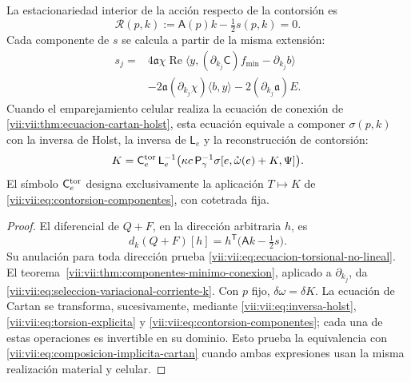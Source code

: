 \begin{proposition}
\label{vii:vii:prop:ecuacion-torsional-no-lineal}
La estacionariedad interior de la acción respecto de la contorsión es
\begin{equation}
 \mathcal R(p,k):=\mathsf A(p)k-\tfrac12s(p,k)=0.
 \label{vii:vii:eq:ecuacion-torsional-no-lineal}
\end{equation}
Cada componente de \(s\) se calcula a partir de la misma extensión:
\begin{equation}
 \begin{split}
 s_j={}&4\mathfrak a\chi\operatorname{Re}
       \langle y,(\partial_{k_j}\mathsf C)f_{\min}
                         -\partial_{k_j}b\rangle\\
 &-2\mathfrak a(\partial_{k_j}\chi)\langle b,y\rangle
       -2(\partial_{k_j}\mathfrak a)E.
 \end{split}
 \label{vii:vii:eq:seleccion-variacional-corriente-k}
\end{equation}
Cuando el emparejamiento celular realiza la ecuación de conexión de
\ref{vii:vii:thm:ecuacion-cartan-holst}, esta ecuación equivale a componer
\(\sigma(p,k)\) con la inversa de Holst, la inversa de
\(\mathsf L_e\) y la reconstrucción de contorsión:
\begin{equation}
 K=\mathsf C_e^{\rm tor}\,\mathsf L_e^{-1}
           \bigl(\kappa c\,\mathsf P_\gamma^{-1}
             \sigma[e,\mathring\omega(e)+K,\Psi]\bigr).
 \label{vii:vii:eq:composicion-implicita-cartan}
\end{equation}
El símbolo \(\mathsf C_e^{\rm tor}\) designa exclusivamente la
aplicación \(T\mapsto K\) de
\eqref{vii:vii:eq:contorsion-componentes}, con cotetrada fija.
\end{proposition}

\begin{proof}
El diferencial de \(Q+F\), en la dirección arbitraria \(h\), es
\[
 d_k(Q+F)[h]
   =h^{\mathsf T}\bigl(\mathsf A k-\tfrac12s\bigr).
\]
Su anulación para toda dirección prueba
\eqref{vii:vii:eq:ecuacion-torsional-no-lineal}.
El teorema~\ref{vii:vii:thm:componentes-minimo-conexion}, aplicado a
\(\partial_{k_j}\), da
\eqref{vii:vii:eq:seleccion-variacional-corriente-k}. Con \(p\) fijo,
\(\delta\omega=\delta K\). La ecuación de Cartan se transforma,
sucesivamente, mediante \eqref{vii:vii:eq:inversa-holst},
\eqref{vii:vii:eq:torsion-explicita} y
\eqref{vii:vii:eq:contorsion-componentes}; cada una de estas operaciones
es invertible en su dominio. Esto prueba la equivalencia con
\eqref{vii:vii:eq:composicion-implicita-cartan} cuando ambas expresiones
usan la misma realización material y celular.
\end{proof}

